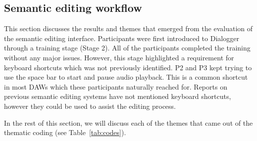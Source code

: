 \subsection{Semantic editing workflow}\label{sec:resultsnew}
This section discusses the results and themes that emerged from the evaluation of the semantic editing interface.
Participants were first introduced to Dialogger through a training stage (Stage 2). All of the
participants completed the training without any major issues. However, this stage highlighted a requirement for
keyboard shortcuts which was not previously identified.  P2 and P3 kept trying to use the space bar to start and pause
audio playback. This is a common shortcut in most DAWs which these participants naturally reached for. Reports on
previous semantic editing systems have not mentioned keyboard shortcuts, however they could be used to assist the
editing process.

In the rest of this section, we will discuss each of the themes that came out of the thematic coding (see Table~\ref{tab:codes}).







